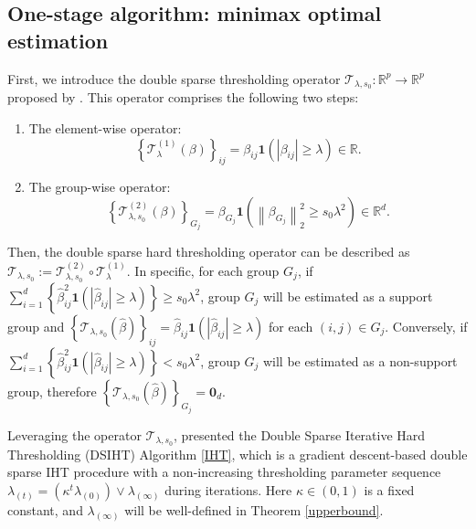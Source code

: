 \documentclass[12pt]{article}
\begin{document}
\subsection{One-stage algorithm: minimax optimal estimation}\label{3.1}
First, we introduce the double sparse thresholding operator $\mathcal T_{\lambda,s_0}:\mathbb R^p \to \mathbb R^p$ proposed by \cite{ZL23}. 
This operator comprises the following two steps:
\begin{enumerate}
    \item The element-wise operator:
        \begin{equation}\label{element}
             \left\{ \mathcal T_\lambda^{(1)}(\beta)\right\}_{ij} = \beta_{ij} \mathbf 1(|\beta_{ij}| \ge \lambda) \in \mathbb R.
        \end{equation}
    \item The group-wise operator:
        \begin{equation}\label{group}
             \left\{ \mathcal T_{\lambda,s_0}^{(2)}(\beta)\right\}_{G_j} 
= \beta_{G_j} \mathbf1 \left( \left\| \beta_{G_j} \right\|_2^2 \ge s_0 \lambda^2  \right) \in \mathbb R^{d}.
\end{equation}
\end{enumerate}
Then, the double sparse hard thresholding operator can be described as $\mathcal T_{\lambda,s_0}:= \mathcal T_{\lambda,s_0}^{(2)} \circ \mathcal T_{\lambda}^{(1)}$. 
In specific, for each group $G_j$, if $\sum_{i=1}^{d} \left\{ \hat \beta_{ij}^2 \mathbf 1(|\hat \beta_{ij}| \ge \lambda) \right\} \ge s_0\lambda^2$, group $G_j$ will be estimated as a support group and $\left\{ \mathcal T_{\lambda,s_0}(\hat\beta) \right\}_{ij} = \hat\beta_{ij} \mathbf 1(|\hat\beta_{ij}| \ge \lambda)$ for each $ (i,j) \in G_j$.
Conversely, if $\sum_{i=1}^{d} \left\{ \hat\beta_{ij}^2 \mathbf 1(|\hat\beta_{ij}| \ge \lambda) \right\} < s_0\lambda^2$, group $G_j$ will be estimated as a non-support group, therefore $\left\{ \mathcal T_{\lambda,s_0}(\hat\beta) \right\}_{G_j} = \mathbf 0_d$. 

Leveraging the operator $\mathcal T_{\lambda,s_0}$, \cite{ZL23} presented the Double Sparse Iterative Hard Thresholding (DSIHT) Algorithm \ref{IHT}, which is a gradient descent-based double sparse IHT procedure with a non-increasing thresholding parameter sequence $\lambda_{(t)}= \left( \kappa^{t} \lambda_{(0)} \right) \vee \lambda_{(\infty)}$ during iterations.
Here $\kappa \in (0,1)$ is a fixed constant, and $\lambda_{(\infty)}$ will be well-defined in Theorem \ref{upperbound}.
\end{document}
